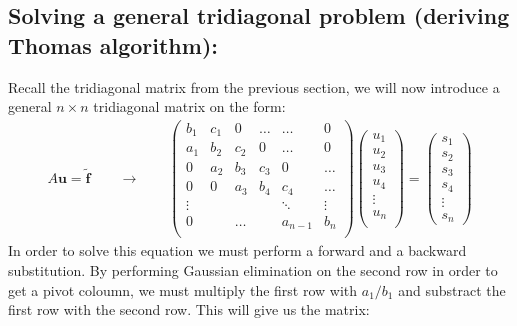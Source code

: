 \documentclass[a4paper, 10pt]{article}
\begin{document}
\subsection{Solving a general tridiagonal problem (deriving Thomas algorithm):}
Recall the tridiagonal matrix from the previous section, we will now introduce a
general $n\times n$ tridiagonal matrix on the form:
\begin{align}
  A\mathbf{u} = \tilde{\mathbf{f}} \qquad \to \qquad
  \begin{pmatrix}
    b_{1} & c_1 & 0 & \ldots &  \ldots & 0\\
    a_1 & b_2 & c_2  & 0 & \ldots & 0\\
    0 & a_2 & b_3 &c_3 & 0 & \ldots \\
    0 & 0 & a_3 & b_4 &c_4 &\ldots\\
    \vdots &  & &  &\ddots & \vdots \\
    0 && \ldots && a_{n-1}&  b_n  \\
  \end{pmatrix}\begin{pmatrix}
    u_1\\
    u_2\\
    u_3\\
    u_4\\
    \vdots\\
    u_n\\
  \end{pmatrix}=
  \begin{pmatrix}
    s_1\\
    s_2\\
    s_3\\
    s_4\\
    \vdots\\
    s_n
  \end{pmatrix}
\end{align}
In order to solve this equation we must
perform a forward and a backward substitution. By performing Gaussian elimination on the second row in order to get a pivot coloumn, we must
multiply the first row with $a_{1}/b_{1}$ and substract the first row with the second row. This will give us the matrix:
\end{document}
